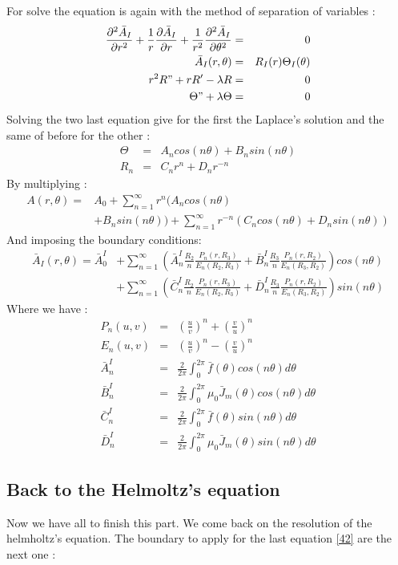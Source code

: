 For solve the equation is again with the method of separation of variables :
\begin{eqnarray}
\frac{\partial^2\bar{A}_I}{\partial r^2}+ \frac{1}{r}\frac{\partial\bar{A}_I}{\partial r}+\frac{1}{r^2}\frac{\partial^2 \bar{A}_I}{\partial \theta^2}&=&0\\
\bar{A}_I(r,\theta) &=& R_I(r) \Theta_I(\theta) \\
r^2R"+rR'-\lambda R &=& 0\\
\Theta"+\lambda\Theta &=& 0
\end{eqnarray}
Solving the two last equation give for the first the Laplace's solution and the same of before for the other :
\begin{eqnarray}
\Theta &=& A_n cos(n\theta) + B_n sin(n\theta)\\
R_n &=& C_n r^{n} + D_n r^{-n}
\end{eqnarray}
By multiplying :
\begin{eqnarray}
A(r,\theta) = &A_0 + \sum_{n=1}^\infty r^n(A_ncos(n\theta)\\
&+B_nsin(n\theta))+ \sum_{n=1}^\infty r^{-n}(C_ncos(n\theta)+D_nsin(n\theta))
\end{eqnarray}
And imposing the boundary conditions: 
\begin{eqnarray}
\bar{A}_I(r,\theta) = \bar{A}_0^I &+ \sum_{n=1}^\infty \left(\bar{A}_n^I\frac{R_2}{n}\frac{P_n(r,R_3)}{E_n(R_2,R_3)}+\bar{B}_n^I\frac{R_3}{n}\frac{P_n(r,R_2)}{E_n(R_3,R_2)}\right) cos(n\theta)\\
& + \sum_{n=1}^\infty \left(\bar{C}_n^I\frac{R_2}{n}\frac{P_n(r,R_3)}{E_n(R_2,R_3)}+\bar{D}_n^I\frac{R_3}{n}\frac{P_n(r,R_2)}{E_n(R_3,R_2)}\right) sin(n\theta)
\end{eqnarray}
Where we have :
\begin{eqnarray}
P_n(u,v) &=& \left(\frac{u}{v}\right)^n + \left(\frac{v}{u}\right)^n\\
E_n(u,v) &=& \left(\frac{u}{v}\right)^n - \left(\frac{v}{u}\right)^n\\
\bar{A}_n^I &=& \frac{2}{2\pi}\int_0^{2\pi} \bar{f}(\theta)cos(n\theta)d\theta\\
\bar{B}_n^I &=&\frac{2}{2\pi}\int_0^{2\pi} \mu_0\bar{J}_m(\theta)cos(n\theta)d\theta\\
\bar{C}_n^I &=& \frac{2}{2\pi}\int_0^{2\pi} \bar{f}(\theta)sin(n\theta)d\theta\\
\bar{D}_n^I &=& \frac{2}{2\pi}\int_0^{2\pi} \mu_0\bar{J}_m(\theta)sin(n\theta)d\theta
\end{eqnarray}
\subsection{Back to the Helmoltz's equation}
Now we have all to finish this part. We come back on the resolution of the helmholtz's equation. The boundary to apply for the last equation \ref{42} are the next one :

